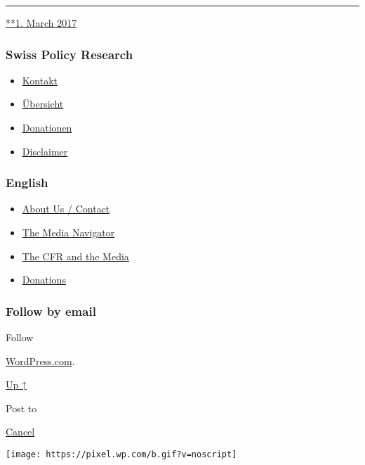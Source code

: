 \begin{center}\rule{0.5\linewidth}{\linethickness}\end{center}

\href{https://swprs.org/2017/03/01/die-logik-imperialer-kriege/}{**1.
March 2017}

\hypertarget{swiss-policy-research}{%
\subsubsection{Swiss Policy Research}\label{swiss-policy-research}}

\begin{itemize}
\tightlist
\item
  \href{https://swprs.org/kontakt/}{Kontakt}
\item
  \href{https://swprs.org/uebersicht/}{Übersicht}
\item
  \href{https://swprs.org/donationen/}{Donationen}
\item
  \href{https://swprs.org/disclaimer/}{Disclaimer}
\end{itemize}

\hypertarget{english}{%
\subsubsection{English}\label{english}}

\begin{itemize}
\tightlist
\item
  \href{https://swprs.org/contact/}{About Us / Contact}
\item
  \href{https://swprs.org/media-navigator/}{The Media Navigator}
\item
  \href{https://swprs.org/the-american-empire-and-its-media/}{The CFR
  and the Media}
\item
  \href{https://swprs.org/donations/}{Donations}
\end{itemize}

\hypertarget{follow-by-email}{%
\subsubsection{Follow by email}\label{follow-by-email}}

Follow

\href{https://wordpress.com/?ref=footer_custom_com}{WordPress.com}.

\protect\hyperlink{}{Up ↑}

Post to

\protect\hyperlink{}{Cancel}

\texttt{[image: https://pixel.wp.com/b.gif?v=noscript]}
